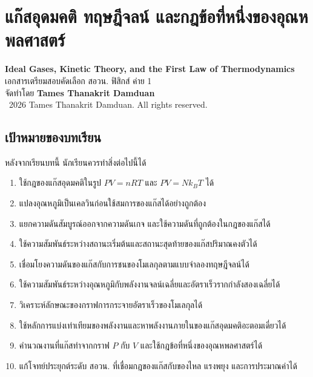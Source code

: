 
\chapter{แก๊สอุดมคติ ทฤษฎีจลน์ และกฎข้อที่หนึ่งของอุณหพลศาสตร์}

\begin{center}
    {\Large \textbf{Ideal Gases, Kinetic Theory, and the First Law of Thermodynamics}}\\[4pt]
    {\normalsize เอกสารเตรียมสอบคัดเลือก สอวน. ฟิสิกส์ ค่าย 1}\\[6pt]
    {\normalsize จัดทำโดย \textbf{Tames Thanakrit Damduan}}\\[2pt]
    {\footnotesize \textcopyright\ 2026 Tames Thanakrit Damduan. All rights reserved.}\\[8pt]
\end{center}

\section*{เป้าหมายของบทเรียน}

หลังจากเรียนบทนี้ นักเรียนควรทำสิ่งต่อไปนี้ได้

\begin{enumerate}
    \item ใช้กฎของแก๊สอุดมคติในรูป $PV=nRT$ และ $PV=Nk_BT$ ได้
    \item แปลงอุณหภูมิเป็นเคลวินก่อนใช้สมการของแก๊สได้อย่างถูกต้อง
    \item แยกความดันสัมบูรณ์ออกจากความดันเกจ และใช้ความดันที่ถูกต้องในกฎของแก๊สได้
    \item ใช้ความสัมพันธ์ระหว่างสถานะเริ่มต้นและสถานะสุดท้ายของแก๊สปริมาณคงตัวได้
    \item เชื่อมโยงความดันของแก๊สกับการชนของโมเลกุลตามแบบจำลองทฤษฎีจลน์ได้
    \item ใช้ความสัมพันธ์ระหว่างอุณหภูมิกับพลังงานจลน์เฉลี่ยและอัตราเร็วรากกำลังสองเฉลี่ยได้
    \item วิเคราะห์ลักษณะของกราฟการกระจายอัตราเร็วของโมเลกุลได้
    \item ใช้หลักการแบ่งเท่าเทียมของพลังงานและหาพลังงานภายในของแก๊สอุดมคติอะตอมเดี่ยวได้
    \item คำนวณงานที่แก๊สทำจากกราฟ $P$ กับ $V$ และใช้กฎข้อที่หนึ่งของอุณหพลศาสตร์ได้
    \item แก้โจทย์ประยุกต์ระดับ สอวน. ที่เชื่อมกฎของแก๊สกับของไหล แรงพยุง และการประมาณค่าได้
\end{enumerate}

